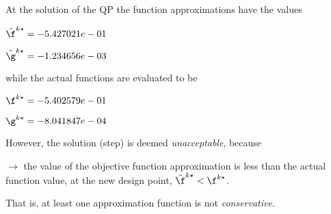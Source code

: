 At the solution of the QP the function approximations have the values

$\tilde \f^{k\star} = -5.427021e-01$

$\tilde \g^{k\star} = -1.234656e-03$

\bigskip
while the actual functions are evaluated to be

$\f^{k\star} = -5.402579e-01$

$\g^{k\star} = -8.041847e-04$

\bigskip
 However, the solution (step)                     is deemed \emph{unacceptable}, because 
 
$\to$ the value of the objective                         function approximation is less than the actual function                         value, at the new design point,                         $\tilde {\f}^{k\star} < {\f}^{k\star}$.

 \bigskip 

 That is, at least one approximation                     function is not \emph{conservative}.
